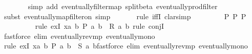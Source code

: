 \begin{isabellebody}
\ \ \ \ \ \ \isamarkupfalse%
{\isacharparenleft}{\kern0pt}simp\ add{\isacharcolon}{\kern0pt}\ eventually{\isacharunderscore}{\kern0pt}filtermap\ split{\isacharunderscore}{\kern0pt}beta\ eventually{\isacharunderscore}{\kern0pt}prod{\isacharunderscore}{\kern0pt}filter{\isacharparenright}{\kern0pt}\isanewline
\ \ \ \ \ \ \isamarkupfalse%
{\isacharparenleft}{\kern0pt}subst\ eventually{\isacharunderscore}{\kern0pt}map{\isacharunderscore}{\kern0pt}filter{\isacharunderscore}{\kern0pt}on{\isacharsemicolon}{\kern0pt}\ simp{\isacharparenright}{\kern0pt}{\isacharplus}{\kern0pt}\isanewline
\ \ \ \ \ \ \isamarkupfalse%
{\isacharparenleft}{\kern0pt}rule\ iffI{\isacharsemicolon}{\kern0pt}\ clarsimp{\isacharparenright}{\kern0pt}\isanewline
\ \ \ \ \ \ \isamarkupfalse%
\ \ P\ P{\isacharprime}{\kern0pt}\ P{\isacharprime}{\kern0pt}{\isacharprime}{\kern0pt}\isanewline
\ \ \ \ \ \ \ \ \isamarkupfalse%
{\isacharparenleft}{\kern0pt}rule\ exI{\isacharbrackleft}{\kern0pt}\ x{\isacharequal}{\kern0pt}{\isachardoublequoteopen}{\isasymlambda}a{\isachardot}{\kern0pt}\ {\isasymexists}b{\isachardot}{\kern0pt}\ P{\isacharprime}{\kern0pt}\ {\isacharparenleft}{\kern0pt}a{\isacharcomma}{\kern0pt}\ b{\isacharparenright}{\kern0pt}\ {\isasymand}\ R\ a\ b{\isachardoublequoteclose}{\isacharbrackright}{\kern0pt}{\isacharsemicolon}{\kern0pt}\ rule\ conjI{\isacharparenright}{\kern0pt}\isanewline
\ \ \ \ \ \ \ \ \isamarkupfalse%
\ \isamarkupfalse%
{\isacharparenleft}{\kern0pt}fastforce\ elim{\isacharcolon}{\kern0pt}\ eventually{\isacharunderscore}{\kern0pt}rev{\isacharunderscore}{\kern0pt}mp\ eventually{\isacharunderscore}{\kern0pt}mono{\isacharparenright}{\kern0pt}\isanewline
\ \ \ \ \ \ \ \ \isamarkupfalse%
\isanewline
\ \ \ \ \ \ \ \ \ \ \isamarkupfalse%
{\isacharparenleft}{\kern0pt}rule\ exI{\isacharbrackleft}{\kern0pt}\ x{\isacharequal}{\kern0pt}{\isachardoublequoteopen}{\isasymlambda}a{\isachardot}{\kern0pt}\ {\isasymexists}b{\isachardot}{\kern0pt}\ P{\isacharprime}{\kern0pt}{\isacharprime}{\kern0pt}\ {\isacharparenleft}{\kern0pt}a{\isacharcomma}{\kern0pt}\ b{\isacharparenright}{\kern0pt}\ {\isasymand}\ S\ a\ b{\isachardoublequoteclose}{\isacharbrackright}{\kern0pt}{\isacharparenright}{\kern0pt}{\isacharparenleft}{\kern0pt}fastforce\ elim{\isacharcolon}{\kern0pt}\ eventually{\isacharunderscore}{\kern0pt}rev{\isacharunderscore}{\kern0pt}mp\ eventually{\isacharunderscore}{\kern0pt}mono{\isacharparenright}{\kern0pt}\isanewline

\end{isabellebody}
